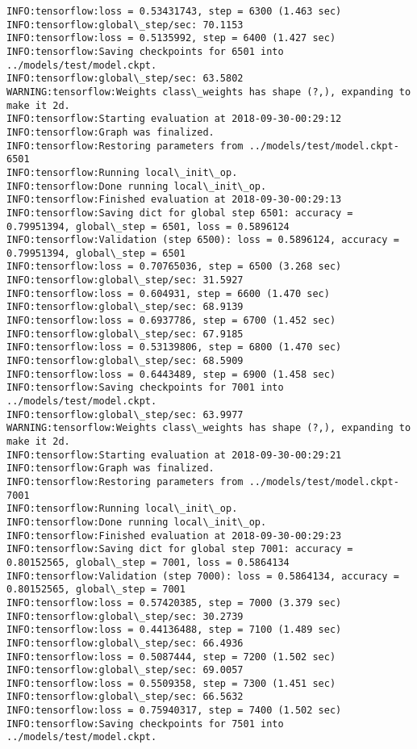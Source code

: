 \documentclass[11pt]{article}
\begin{document}
\begin{Verbatim}[commandchars=\\\{\}]
INFO:tensorflow:loss = 0.53431743, step = 6300 (1.463 sec)
INFO:tensorflow:global\_step/sec: 70.1153
INFO:tensorflow:loss = 0.5135992, step = 6400 (1.427 sec)
INFO:tensorflow:Saving checkpoints for 6501 into ../models/test/model.ckpt.
INFO:tensorflow:global\_step/sec: 63.5802
WARNING:tensorflow:Weights class\_weights has shape (?,), expanding to make it 2d.
INFO:tensorflow:Starting evaluation at 2018-09-30-00:29:12
INFO:tensorflow:Graph was finalized.
INFO:tensorflow:Restoring parameters from ../models/test/model.ckpt-6501
INFO:tensorflow:Running local\_init\_op.
INFO:tensorflow:Done running local\_init\_op.
INFO:tensorflow:Finished evaluation at 2018-09-30-00:29:13
INFO:tensorflow:Saving dict for global step 6501: accuracy = 0.79951394, global\_step = 6501, loss = 0.5896124
INFO:tensorflow:Validation (step 6500): loss = 0.5896124, accuracy = 0.79951394, global\_step = 6501
INFO:tensorflow:loss = 0.70765036, step = 6500 (3.268 sec)
INFO:tensorflow:global\_step/sec: 31.5927
INFO:tensorflow:loss = 0.604931, step = 6600 (1.470 sec)
INFO:tensorflow:global\_step/sec: 68.9139
INFO:tensorflow:loss = 0.6937786, step = 6700 (1.452 sec)
INFO:tensorflow:global\_step/sec: 67.9185
INFO:tensorflow:loss = 0.53139806, step = 6800 (1.470 sec)
INFO:tensorflow:global\_step/sec: 68.5909
INFO:tensorflow:loss = 0.6443489, step = 6900 (1.458 sec)
INFO:tensorflow:Saving checkpoints for 7001 into ../models/test/model.ckpt.
INFO:tensorflow:global\_step/sec: 63.9977
WARNING:tensorflow:Weights class\_weights has shape (?,), expanding to make it 2d.
INFO:tensorflow:Starting evaluation at 2018-09-30-00:29:21
INFO:tensorflow:Graph was finalized.
INFO:tensorflow:Restoring parameters from ../models/test/model.ckpt-7001
INFO:tensorflow:Running local\_init\_op.
INFO:tensorflow:Done running local\_init\_op.
INFO:tensorflow:Finished evaluation at 2018-09-30-00:29:23
INFO:tensorflow:Saving dict for global step 7001: accuracy = 0.80152565, global\_step = 7001, loss = 0.5864134
INFO:tensorflow:Validation (step 7000): loss = 0.5864134, accuracy = 0.80152565, global\_step = 7001
INFO:tensorflow:loss = 0.57420385, step = 7000 (3.379 sec)
INFO:tensorflow:global\_step/sec: 30.2739
INFO:tensorflow:loss = 0.44136488, step = 7100 (1.489 sec)
INFO:tensorflow:global\_step/sec: 66.4936
INFO:tensorflow:loss = 0.5087444, step = 7200 (1.502 sec)
INFO:tensorflow:global\_step/sec: 69.0057
INFO:tensorflow:loss = 0.5509358, step = 7300 (1.451 sec)
INFO:tensorflow:global\_step/sec: 66.5632
INFO:tensorflow:loss = 0.75940317, step = 7400 (1.502 sec)
INFO:tensorflow:Saving checkpoints for 7501 into ../models/test/model.ckpt.

\end{Verbatim}
\end{document}
